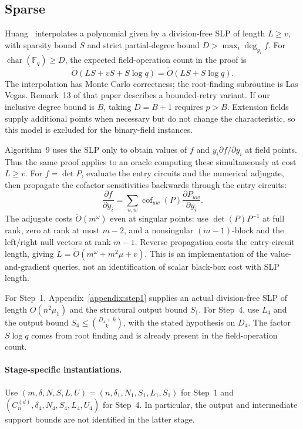 \subsection{Sparse}\label{appendix:sparse_oracle}
Huang~\cite[Definition~2, Algorithm~9 and Theorem~12]{DBLP:journals/jsc/Huang23} interpolates a polynomial given by a division-free SLP of length $L\ge v$, with sparsity bound $S$ and strict partial-degree bound $D>\max_i\deg_{y_i}f$. For $\operatorname{char}(\mathbb F_q)\ge D$, the expected field-operation count in the proof is
\[
 \widetilde O(LS+vS+S\log q)=\widetilde O(LS+S\log q).
\]
The interpolation has Monte Carlo correctness; the root-finding subroutine is Las Vegas. Remark~13 of that paper describes a bounded-retry variant. If our inclusive degree bound is $B$, taking $D=B+1$ requires $p>B$. Extension fields supply additional points when necessary but do not change the characteristic, so this model is excluded for the binary-field \vision instances.

Algorithm~9 uses the SLP only to obtain values of $f$ and $y_i\partial f/\partial y_i$ at field points. Thus the same proof applies to an oracle computing these simultaneously at cost $L\ge v$. For $f=\det P$, evaluate the entry circuits and the numerical adjugate, then propagate the cofactor sensitivities backwards through the entry circuits:
\[
 \frac{\partial f}{\partial y_i}
 =\sum_{u,w}\operatorname{cof}_{uw}(P)\frac{\partial P_{uw}}{\partial y_i}.
\]
The adjugate costs $\widetilde O(m^\omega)$ even at singular points: use $\det(P)P^{-1}$ at full rank, zero at rank at most $m-2$, and a nonsingular $(m-1)$-block and the left/right null vectors at rank $m-1$. Reverse propagation costs the entry-circuit length, giving $L=\widetilde O(m^\omega+m^2\mu+v)$. This is an implementation of the value-and-gradient queries, not an identification of scalar black-box cost with SLP length.

For Step~1, Appendix~\ref{appendix:step1} supplies an actual division-free SLP of length $O(n^2\mu_1)$ and the structural output bound $S_1$. For Step~4, use $L_4$ and the output bound $S_4\le\binom{D_4+k}{k}$, with the stated hypothesis on $D_4$. The factor $S\log q$ comes from root finding and is already present in the field-operation count.

\paragraph{Stage-specific instantiations.}
Use $(m,\delta,N,S,L,U)=(n,\delta_1,N_1,S_1,L_1,S_1)$ for Step~1 and $(C_n^{(d)},\delta_4,N_4,S_4,L_4,U_4)$ for Step~4. In particular, the output and intermediate support bounds are not identified in the latter stage.


